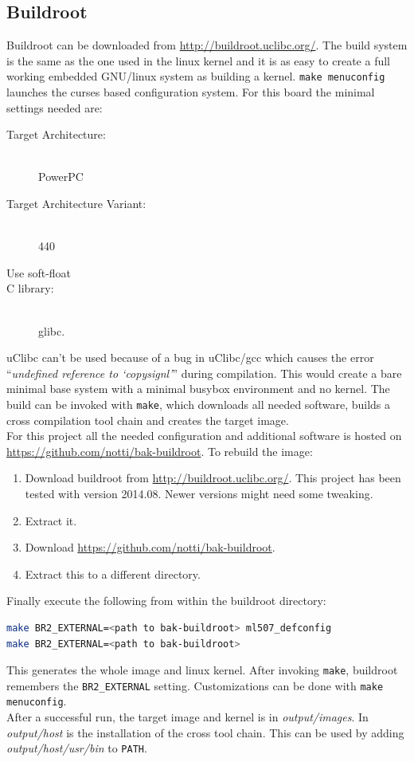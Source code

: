 \documentclass[11pt,technote,a4paper,onecolumn,dvips]{IEEEtran}
\begin{document}
\subsection{Buildroot}
\lstset{language=bash}
Buildroot can be downloaded from \url{http://buildroot.uclibc.org/}. The build
system is the same as the one used in the linux kernel and it is as easy to
create a full working embedded GNU/linux system as building a kernel.
\lstinline+make menuconfig+ launches the curses based configuration system. For this
board the minimal settings needed are:
\begin{description}
    \item[Target Architecture:] \hfill \\ PowerPC
    \item[Target Architecture Variant:] \hfill \\ 440
    \item[Use soft-float]
    \item[C library:] \hfill \\ glibc. 
\end{description}
uClibc can't be used because of a bug in uClibc/gcc which causes the error
``\emph{undefined reference to `copysignl'}'' during compilation.
This would create a bare minimal base system with a minimal busybox
environment and no kernel. The build can be invoked with \lstinline+make+, which
downloads all needed software, builds a cross compilation tool chain and 
creates the target image.\\
For this project all the needed configuration and additional software is
hosted on \url{https://github.com/notti/bak-buildroot}. To rebuild the image:
\begin{enumerate}
    \item Download buildroot from \url{http://buildroot.uclibc.org/}. This
        project has been tested with version 2014.08. Newer versions might
        need some tweaking.
    \item Extract it.
    \item Download \url{https://github.com/notti/bak-buildroot}.
    \item Extract this to a different directory.
\end{enumerate}
Finally execute the following from within the buildroot directory:
\begin{lstlisting}[language=bash,basicstyle=\ttfamily\tiny]
make BR2_EXTERNAL=<path to bak-buildroot> ml507_defconfig
make BR2_EXTERNAL=<path to bak-buildroot>
\end{lstlisting}
This generates the whole image and linux kernel. After invoking \lstinline+make+,
buildroot remembers the \lstinline+BR2_EXTERNAL+ setting. Customizations can be
done with \lstinline+make menuconfig+.\\
After a successful run, the target image and kernel is in \emph{output/images}.
In \emph{output/host} is the installation of the cross tool chain. This can be
used by adding \emph{output/host/usr/bin} to \lstinline+PATH+.
\end{document}
